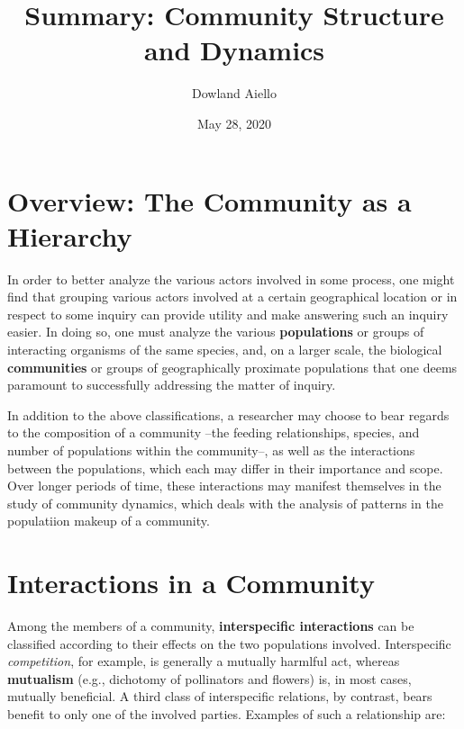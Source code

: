 \documentclass{article}
\begin{document}
\title{Summary: Community Structure and Dynamics}
\author{Dowland Aiello}
\date{May 28, 2020}

\maketitle
\tableofcontents
\fancyhf{}

\newpage

\section{Overview: The Community as a Hierarchy}

In order to better analyze the various actors involved in some process, one might find that grouping various
actors involved at a certain geographical location or in respect to some inquiry can provide utility and make
answering such an inquiry easier. In doing so, one must analyze the various \textbf{populations} or groups of
interacting organisms of the same species, and, on a larger scale, the biological \textbf{communities} or groups
of geographically proximate populations that one deems paramount to successfully addressing the matter of inquiry.

In addition to the above classifications, a researcher may choose to bear regards to the composition of a community
--the feeding relationships, species, and number of populations within the community--, as well as the interactions
between the populations, which each may differ in their importance and scope. Over longer periods of time, these
interactions may manifest themselves in the study of community dynamics, which deals with the analysis of patterns
in the populatiion makeup of a community.

\section{Interactions in a Community}

Among the members of a community, \textbf{interspecific interactions} can be classified according to their effects
on the two populations involved. Interspecific \emph{competition}, for example, is generally a mutually harmlful
act, whereas \textbf{mutualism} (e.g., dichotomy of pollinators and flowers) is, in most cases, mutually 
beneficial. A third class of interspecific relations, by contrast, bears benefit to only one of the involved
parties. Examples of such a relationship are:
\end{document}
